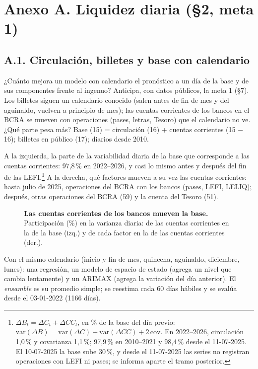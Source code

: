 \section*{Anexo A. Liquidez diaria (§2, meta 1)}
\subsection*{A.1. Circulación, billetes y base con calendario}
 ¿Cuánto mejora un modelo con calendario el pronóstico a un día de la base y de sus componentes frente al ingenuo? Anticipa, con datos públicos, la meta 1 (§7).
 Los billetes siguen un calendario conocido (salen antes de fin de mes y del aguinaldo, vuelven a principio de mes); las cuentas corrientes de los bancos en el BCRA se mueven con operaciones (pases, letras, Tesoro) que el calendario no ve. ¿Qué parte pesa más?  Base (15) = circulación (16) + cuentas corrientes (15 $-$ 16); billetes en público (17); diarios desde 2010.

 A la izquierda, la parte de la variabilidad diaria de la base que corresponde a las cuentas corrientes: 97,8\,\% en 2022--2026, y casi lo mismo antes y después del fin de las LEFI.\footnote{$\Delta B_t=\Delta C_t+\Delta CC_t$, en \% de la base del día previo: $\mathrm{var}(\Delta B)=\mathrm{var}(\Delta C)+\mathrm{var}(\Delta CC)+2\,\mathrm{cov}$. En 2022--2026, circulación 1,0\,\% y covarianza 1,1\,\%; 97,9\,\% en 2010--2021 y 98,4\,\% desde el 11-07-2025. El 10-07-2025 la base sube 30\,\%, y desde el 11-07-2025 las series no registran operaciones con LEFI ni pases; se informa aparte el tramo posterior.} A la derecha, qué factores mueven a su vez las cuentas corrientes: hasta julio de 2025, operaciones del BCRA con los bancos (pases, LEFI, LELIQ); después, otras operaciones del BCRA (59) y la cuenta del Tesoro (51).

\begin{figure}[H]\centering
\caption{\textbf{Las cuentas corrientes de los bancos mueven la base.} Participación (\%) en la varianza diaria: de las cuentas corrientes en la de la base (izq.) y de cada factor en la de las cuentas corrientes (der.).}\label{f:var}
\end{figure}

 Con el mismo calendario (inicio y fin de mes, quincena, aguinaldo, diciembre, lunes): una regresión, un modelo de espacio de estado (agrega un nivel que cambia lentamente) y un ARIMAX (agrega la variación del día anterior). El \emph{ensamble} es su promedio simple; se reestima cada 60 días hábiles y se evalúa desde el 03-01-2022 (1166 días).

